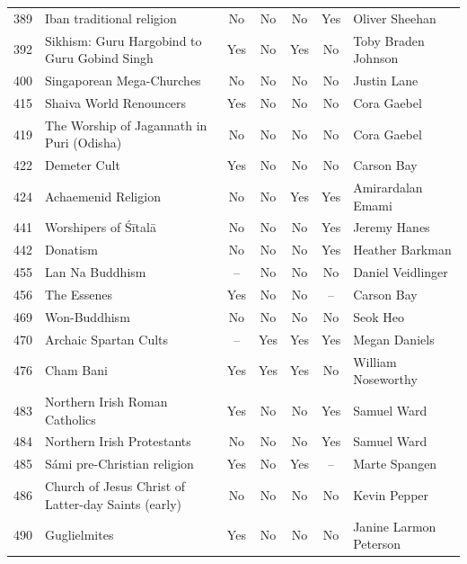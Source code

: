 {\begin{longtable}{rp{3.5cm}ccccp{3cm}}
389 & {\raggedright Iban traditional religion} & No & No & No & Yes & {\raggedright Oliver Sheehan} \\
392 & {\raggedright Sikhism: Guru Hargobind to Guru Gobind Singh} & Yes & No & Yes & No & {\raggedright Toby Braden Johnson} \\
400 & {\raggedright Singaporean Mega-Churches} & No & No & No & No & {\raggedright Justin Lane} \\
415 & {\raggedright Shaiva World Renouncers} & Yes & No & No & No & {\raggedright Cora Gaebel} \\
419 & {\raggedright The Worship of Jagannath in Puri (Odisha)} & No & No & No & No & {\raggedright Cora Gaebel} \\
422 & {\raggedright Demeter Cult} & Yes & No & No & No & {\raggedright Carson Bay} \\
424 & {\raggedright Achaemenid Religion} & No & No & Yes & Yes & {\raggedright Amirardalan Emami} \\
441 & {\raggedright Worshipers of Śītalā} & No & No & No & Yes & {\raggedright Jeremy Hanes} \\
442 & {\raggedright Donatism} & No & No & No & Yes & {\raggedright Heather Barkman} \\
455 & {\raggedright Lan Na Buddhism} & -- & No & No & No & {\raggedright Daniel Veidlinger} \\
456 & {\raggedright The Essenes} & Yes & No & No & -- & {\raggedright Carson Bay} \\
469 & {\raggedright Won-Buddhism} & No & No & No & No & {\raggedright Seok Heo} \\
470 & {\raggedright Archaic Spartan Cults} & -- & Yes & Yes & Yes & {\raggedright Megan Daniels} \\
476 & {\raggedright Cham Bani} & Yes & Yes & Yes & No & {\raggedright William Noseworthy} \\
483 & {\raggedright Northern Irish Roman Catholics} & Yes & No & No & Yes & {\raggedright Samuel Ward} \\
484 & {\raggedright Northern Irish Protestants} & No & No & No & Yes & {\raggedright Samuel Ward} \\
485 & {\raggedright Sámi pre-Christian religion} & Yes & No & Yes & -- & {\raggedright Marte Spangen} \\
486 & {\raggedright Church of Jesus Christ of Latter-day Saints (early)} & No & No & No & No & {\raggedright Kevin Pepper} \\
490 & {\raggedright Guglielmites} & Yes & No & No & No & {\raggedright Janine Larmon Peterson} \\

\end{longtable}}

